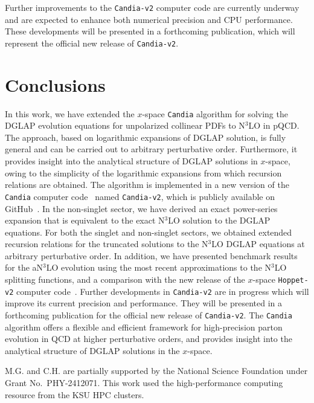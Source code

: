 \documentclass[12pt,notitlepage,aps,preprintnumbers,superscriptaddress,nofootinbib,aps,prd,floatfix]{revtex4-2}
\begin{document}
Further improvements to the \texttt{Candia-v2} computer code are currently underway and are expected to enhance both numerical precision and CPU performance. These developments will be presented in a forthcoming publication, which will represent the official new release of \texttt{Candia-v2}.



\section{Conclusions}
\label{conclusions}

In this work, we have extended the $x$-space \texttt{Candia} algorithm for solving the DGLAP evolution equations for unpolarized collinear PDFs to N$^3$LO in pQCD. The approach, based on logarithmic expansions of DGLAP solution, is fully general and can be carried out to arbitrary perturbative order. 
%
Furthermore, it provides insight into the analytical structure of DGLAP solutions in 
$x$-space, owing to the simplicity of the logarithmic expansions from which recursion relations are obtained.
%
The algorithm is implemented in a new version of the \texttt{Candia} computer code~\cite{candiav1} named \texttt{Candia-v2}, which is publicly available on GitHub~\cite{candiav2}.
%
In the non-singlet sector, we have derived an exact power-series expansion that is equivalent to the exact N$^3$LO solution to the DGLAP equations. For both the singlet and non-singlet sectors, we obtained extended recursion relations for the truncated solutions to the N$^3$LO DGLAP equations at arbitrary perturbative order.  
%
In addition, we have presented benchmark results for the aN$^3$LO evolution using the most recent approximations to the N$^3$LO splitting functions, and a comparison with the new release of the $x$-space \texttt{Hoppet-v2} computer code~\cite{Karlberg:2026kte}.  
%
Further developments in \texttt{Candia-v2} are in progress which will improve its current precision and performance. They will be presented in a forthcoming publication for the official new release of \texttt{Candia-v2}. The \texttt{Candia} algorithm offers a flexible and efficient framework for high-precision parton evolution in QCD at higher perturbative orders, and provides insight into the analytical structure of DGLAP solutions in the $x$-space.     





\begin{acknowledgements}
M.G. and C.H. are partially supported by the National Science Foundation under Grant No.~PHY-2412071. This work used the high-performance computing resource from the KSU HPC clusters.
\end{acknowledgements}





\end{document}
